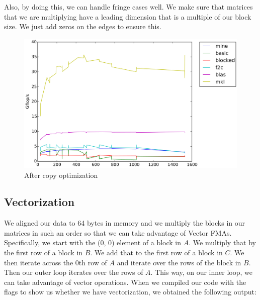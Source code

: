 \documentclass[11pt]{article}
\begin{document}
        Also, by doing this, we can handle fringe cases well. We make sure that matrices that we are multiplying have a leading dimension that is a multiple of our block size. We just add zeros on the edges to ensure this.
        
        \begin{figure}[H]
            \centering
            \includegraphics[width=4.5in]{timing_32_cp.png}
            \caption{After copy optimization}
        \end{figure}
        
        \clearpage
            
    
                
        \subsection{Vectorization}
        We aligned our data to 64 bytes in memory and we multiply the blocks in our matrices in such an order so that we can take advantage of Vector FMAs. Specifically, we start with the (0, 0) element of a block in $A$. We multiply that by the first row of a block in $B$. We add that to the first row of a block in $C$. We then iterate across the 0th row of $A$ and iterate over the rows of the block in $B$. Then our outer loop iterates over the rows of $A$. This way, on our inner loop, we can take advantage of vector operations. When we compiled our code with the flags to show us whether we have vectorization, we obtained the following output:
        
        \vspace{1cm}
        
\end{document}
